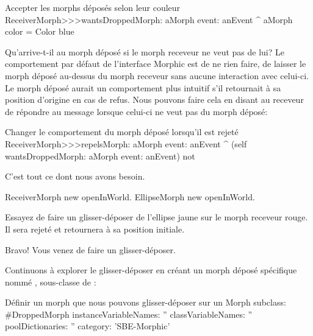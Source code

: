 \documentclass[a4paper,10pt,twoside]{book}
\begin{document}
\begin{method}{Accepter les morphs d\'epos\'es selon leur couleur}
ReceiverMorph>>>wantsDroppedMorph: aMorph event: anEvent
	^ aMorph color = Color blue
\end{method}

Qu'arrive-t-il au morph d\'epos\'e si le morph receveur ne veut pas de lui?
Le comportement par d\'efaut de l'interface Morphic est de ne rien
faire, \cad de laisser le morph d\'epos\'e au-dessus du morph receveur
sans aucune interaction avec celui-ci. 
Le morph d\'epos\'e aurait un comportement plus intuitif s'il
retournait \`a sa position d'origine en cas de refus.
Nous pouvons faire cela en disant au receveur de r\'epondre 
au message   lorsque celui-ci ne
veut pas du morph d\'epos\'e:

\begin{method}{Changer le comportement du morph d\'epos\'e lorsqu'il est rejet\'e}
ReceiverMorph>>>repelsMorph: aMorph event: anEvent
	^ (self wantsDroppedMorph: aMorph event: anEvent) not
\end{method}

C'est tout ce dont nous avons besoin.

\begin{code}{}
ReceiverMorph new openInWorld.
EllipseMorph new openInWorld.
\end{code}
\noindent
Essayez de faire un glisser-d\'eposer de l'ellipse jaune
 sur le morph receveur rouge. Il sera rejet\'e et
retournera \`a sa position initiale.


Bravo! Vous venez de faire un glisser-d\'eposer.

Continuons \`a explorer le glisser-d\'eposer en cr\'eant un morph
d\'epos\'e sp\'ecifique nomm\'e ,
sous-classe de :

\begin{classdef}{D\'efinir un morph que nous pouvons glisser-d\'eposer sur un }
Morph subclass: #DroppedMorph
	instanceVariableNames: ''
	classVariableNames: ''
	poolDictionaries: ''
	category: 'SBE-Morphic'
\end{classdef}
\end{document}
